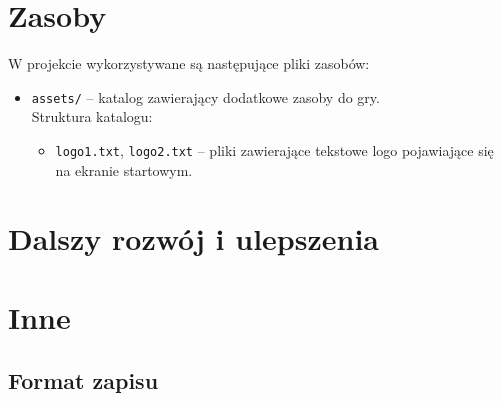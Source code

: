 \documentclass{article}
\begin{document}
\section{Zasoby}

W projekcie wykorzystywane są następujące pliki zasobów:
    \begin{itemize}
    \item \texttt{assets/} – katalog zawierający dodatkowe zasoby do gry.\\
    Struktura katalogu:
        \begin{itemize}
            \item \texttt{logo1.txt}, \texttt{logo2.txt} – pliki zawierające tekstowe logo pojawiające się na ekranie startowym.
        \end{itemize}
    \end{itemize}

\section{Dalszy rozwój i ulepszenia}

\section{Inne}

\subsection{Format zapisu}
\end{document}
